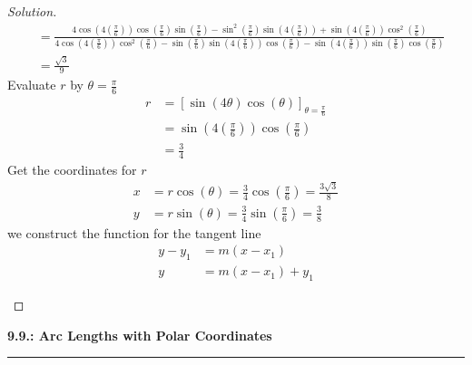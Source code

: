 \documentclass[12pt]{article}
\begin{document}
\begin{enumerate}
\begin{proof}[Solution]
\begin{align*}
					& = \frac{4\cos\left(4\left(\frac{\pi}{6}\right)\right)\cos\left(\frac{\pi}{6}\right)\sin\left(\frac{\pi}{6}\right)-\sin^2\left(\frac{\pi}{6}\right)\sin\left(4\left(\frac{\pi}{6}\right)\right)+\sin\left(4\left(\frac{\pi}{6}\right)\right)\cos^2\left(\frac{\pi}{6}\right)}{4\cos\left(4\left(\frac{\pi}{6}\right)\right)\cos^2\left(\frac{\pi}{6}\right)-\sin\left(\frac{\pi}{6}\right)\sin\left(4\left(\frac{\pi}{6}\right)\right)\cos\left(\frac{\pi}{6}\right)-\sin\left(4\left(\frac{\pi}{6}\right)\right)\sin\left(\frac{\pi}{6}\right)\cos\left(\frac{\pi}{6}\right)} \\
					& = \frac{\sqrt{3}}{9}
				\end{align*}
				Evaluate \(r\) by \(\theta=\frac{\pi}{6}\)
				\begin{align*}
					r & = \left[\sin\left(4\theta\right)\cos\left(\theta\right)\right]_{\theta=\frac{\pi}{6}} \\
					& = \sin\left(4\left(\frac{\pi}{6}\right)\right)\cos\left(\frac{\pi}{6}\right) \\
					& = \frac{3}{4}
				\end{align*}
				Get the coordinates for \(r\)
				\begin{align*}
					x & = r\cos\left(\theta\right) = \frac{3}{4}\cos\left(\frac{\pi}{6}\right) = \frac{3\sqrt{3}}{8} \\
					y & = r\sin\left(\theta\right) = \frac{3}{4}\sin\left(\frac{\pi}{6}\right) = \frac{3}{8}
				\end{align*}
				we construct the function for the tangent line
				\begin{align*}
					y-y_1 & =m\left(x-x_1\right) \\
					y & =m\left(x-x_1\right)+y_1
				\end{align*}
				\begin{center}
				\end{center}
			\end{proof}
			
		\end{enumerate}
	
	\newpage
	\noindent
	{\Large \textbf{9.9.: Arc Lengths with Polar Coordinates}} \\
	\hrule
	
\end{document}
